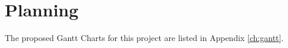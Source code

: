 \section{Planning}

The proposed Gantt Charts for this project are listed in Appendix \ref{ch:gantt}.